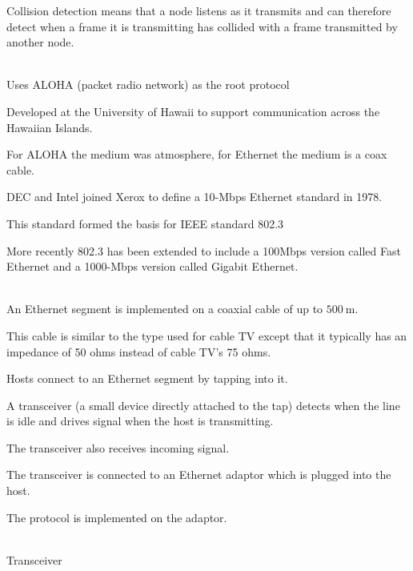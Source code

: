 \begin{description}
  \ite Collision detection means that a node listens as it transmits and can therefore detect when a frame it is transmitting has collided with a frame transmitted by another node.

\ei


\os{\newpage}\item[{\rot\bf  Ethernet }]~\\[-3ex]

\bi
  \ite Uses ALOHA (packet radio network) as the root protocol

  \ite Developed at the University of Hawaii to support communication across the Hawaiian Islands.

  \ite For ALOHA the medium was atmosphere, for Ethernet the medium is a coax cable.

  \ite DEC and Intel joined Xerox to define a 10-Mbps Ethernet standard in 1978.

  \ite This standard formed the basis for IEEE standard 802.3

  \ite More recently 802.3 has been extended to include a 100Mbps version called Fast Ethernet and a 1000-Mbps version called Gigabit Ethernet.

\ei


\os{\newpage}\item[{\rot\bf  Ethernet }]~\\[-3ex]

\bi
  \ite An Ethernet segment is implemented on a coaxial cable of up to $500 \mathrm{~m}$.

  \ite This cable is similar to the type used for cable TV except that it typically has an impedance of 50 ohms instead of cable TV's 75 ohms.

  \ite Hosts connect to an Ethernet segment by tapping into it.

  \ite A transceiver (a small device directly attached to the tap) detects when the line is idle and drives signal when the host is transmitting.

  \ite The transceiver also receives incoming signal.

  \ite The transceiver is connected to an Ethernet adaptor which is plugged into the host.

  \ite The protocol is implemented on the adaptor.

\ei


\os{\newpage}\item[{\rot\bf  Ethernet }]~\\[-3ex]

Transceiver


\end{description}
